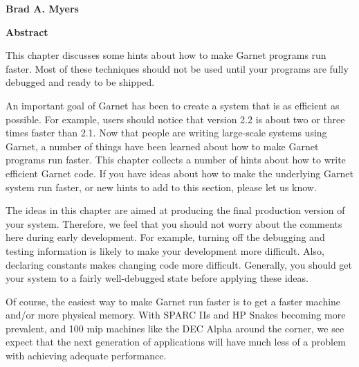 
\begin{titlepage}
\begin{titlebox}
\vspace{0.6 inch}

{\bf Brad A. Myers}
\vspace{0.3 line}
\value{date}
\end{titlebox}
\vspace{0.5 inch}
{\bf Abstract}

\begin{text}
This chapter discusses some hints about how to make Garnet programs
run faster.  Most of these techniques should not be used until your
programs are fully debugged and ready to be shipped.
\vspace{0.7 inch}

\end{text}
\end{titlepage}




An important goal of Garnet has been to create a system that is as
efficient as possible.  For example, users should notice that version 2.2
is about two or three times faster than 2.1.  Now that
people are writing large-scale systems using Garnet, a number of
things have been learned about how to make Garnet programs run faster.
This chapter collects a number of hints about how to write efficient
Garnet code.  If you have ideas about how to make the underlying
Garnet system run faster, or new hints to add to this section, please
let us know.

The ideas in this chapter are aimed at producing the final production
version of your system.  Therefore, we feel that you should not worry
about the comments here during early development.  For example,
turning off the debugging and testing information is likely to make
your development more difficult.  Also, declaring constants makes
changing code more difficult.  Generally, you should get your system
to a fairly well-debugged state before applying these ideas.

Of course, the easiest way to make Garnet run faster is to get a
faster machine and/or more physical memory.  With SPARC IIs and HP
Snakes becoming more prevalent, and 100 mip machines like the DEC
Alpha around the corner, we see expect that the next generation of
applications will have much less of a problem with achieving adequate
performance.

